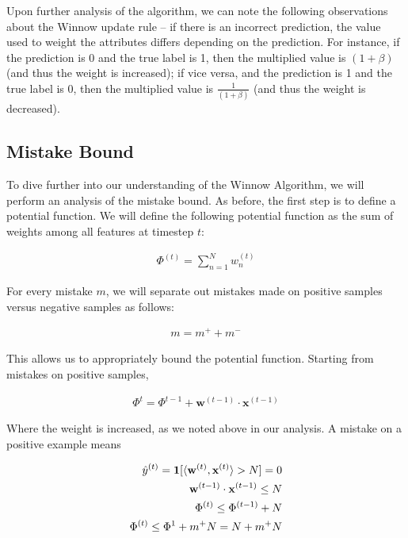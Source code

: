 \documentclass[11pt]{article}
\begin{document}
Upon further analysis of the algorithm, we can note the following observations about the Winnow update rule – if there is an incorrect prediction, the value used to weight the attributes differs depending on the prediction. For instance, if the prediction is 0 and the true label is 1, then the multiplied value is $(1+\beta)$ (and thus the weight is increased); if vice versa, and the prediction is 1 and the true label is 0, then the multiplied value is $\frac{1}{(1+\beta)}$ (and thus the weight is decreased).

\subsection{Mistake Bound}

To dive further into our understanding of the Winnow Algorithm, we will perform an analysis of the mistake bound. As before, the first step is to define a potential function. We will define the following potential function as the sum of weights among all features at timestep $t$:

\begin{align}
  \Phi^{(t)} = \sum_{n=1}^N w_n^{(t)} \label{eq:WinnowPotential} 
\end{align}

For every mistake $m$, we will separate out mistakes made on positive samples versus negative samples as follows:

\begin{align}
    m = m^+ + m^-
\end{align}

This allows us to appropriately bound the potential function. Starting from mistakes on positive samples, 

\begin{align}
    \Phi^t = \Phi^{t-1} + \pmb{w}^{(t-1)} \cdot \pmb{x}^{(t-1)}
\end{align}

Where the weight is increased, as we noted above in our analysis. A mistake on a positive example means

\begin{align}
    \hat{y}^{(t)}=\textbf{1}[\langle \textbf w^{(t)}, \textbf x^{(t)}\rangle>N]=0 \\
    \textbf{w}^{(t-1)}\cdot \textbf{x}^{(t-1)} \leq N \\
     \Phi^{(t)} \leq \Phi^{(t-1)} + N \\ 
    \Phi^{(t)} \leq \Phi^{1} + m^+N = N + m^+N \label{eq:PositiveUpdate}
\end{align}
\end{document}
